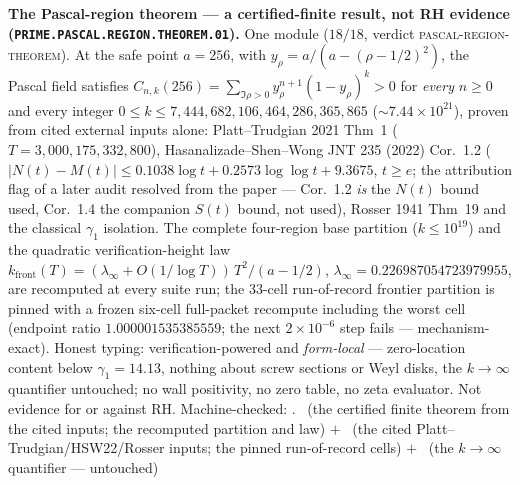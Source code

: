 \documentclass[11pt,a4paper]{article}
\theoremstyle{definition}
\begin{document}
\par\smallskip\noindent\textbf{The Pascal-region theorem --- a
certified-finite result, not RH evidence
(\texttt{PRIME.PASCAL.\allowbreak REGION.\allowbreak THEOREM.01}).}
One module ($18/18$, verdict \textsc{pascal-region-theorem}).  At
the safe point $a = 256$, with $y_\rho = a/(a - (\rho - 1/2)^2)$,
the Pascal field satisfies $C_{n,k}(256) = \sum_{\Im\rho > 0}
y_\rho^{n+1}(1 - y_\rho)^k > 0$ for \emph{every} $n \ge 0$ and
every integer $0 \le k \le
7{,}444{,}682{,}106{,}464{,}286{,}365{,}865$
($\sim 7.44\times10^{21}$), proven from cited external inputs
alone: Platt--Trudgian 2021 Thm~1
($T = 3{,}000{,}175{,}332{,}800$), Hasanalizade--Shen--Wong JNT
235 (2022) Cor.~1.2 ($|N(t) - M(t)| \le 0.1038\log t +
0.2573\log\log t + 9.3675$, $t \ge e$; the attribution flag of a
later audit resolved from the paper --- Cor.~1.2 \emph{is} the
$N(t)$ bound used, Cor.~1.4 the companion $S(t)$ bound, not
used), Rosser 1941 Thm~19 and the classical $\gamma_1$
isolation.  The complete four-region base partition
($k \le 10^{19}$) and the quadratic verification-height law
$k_{\mathrm{front}}(T) = (\lambda_\infty +
O(1/\log T))\,T^2/(a - 1/2)$, $\lambda_\infty =
0.226987054723979955$, are recomputed at every suite run; the
33-cell run-of-record frontier partition is pinned with a frozen
six-cell full-packet recompute including the worst cell
(endpoint ratio $1.000001535385559$; the next $2\times10^{-6}$
step fails --- mechanism-exact).  Honest typing:
verification-powered and \emph{form-local} --- zero-location
content below $\gamma_1 = 14.13$, nothing about screw sections
or Weyl disks, the $k \to \infty$ quantifier untouched; no wall
positivity, no zero table, no zeta evaluator.  Not evidence for
or against RH.
Machine-checked: .
\mE\ (the certified finite theorem from the cited inputs; the
recomputed partition and law) $+$ \mC\ (the cited
Platt--Trudgian/HSW22/Rosser inputs; the pinned run-of-record
cells) $+$ \mO\ (the $k \to \infty$ quantifier --- untouched)
\par\smallskip
\end{document}
